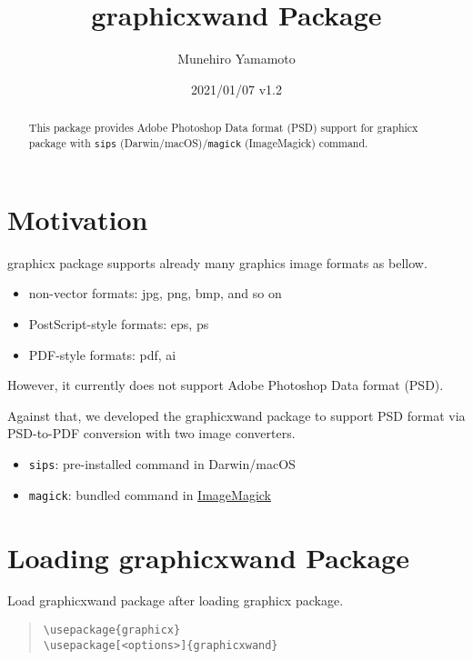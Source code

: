 \documentclass[luatex]{article}
\title{\textsf{graphicxwand} Package}
\author{Munehiro Yamamoto} %
\date{2021/01/07 v1.2} %
\begin{document}
\maketitle
\begin{abstract} %
This package provides Adobe Photoshop Data format (PSD) support
for \textsf{graphicx} package
with \texttt{sips} (Darwin/macOS)/\texttt{magick} (ImageMagick) command.
\end{abstract}


\section{Motivation} %
\textsf{graphicx} package supports already many graphics image formats as bellow.
\begin{itemize}
\item non-vector formats: jpg, png, bmp, and so on
\item PostScript-style formats: eps, ps
\item PDF-style formats: pdf, ai
\end{itemize}
However, it currently does not support Adobe Photoshop Data format (PSD).

Against that, we developed the \textsf{graphicxwand} package
to support PSD format via PSD-to-PDF conversion
with two image converters.
\begin{itemize}
\item \texttt{sips}:
pre-installed command in Darwin/macOS

\item \texttt{magick}:
bundled command in \href{https://www.imagemagick.org/}{ImageMagick}
\end{itemize}

\section{Loading \textsf{graphicxwand} Package}

Load \textsf{graphicxwand} package after loading \textsf{graphicx} package.

\begin{quote}
\begin{verbatim}
\usepackage{graphicx}
\usepackage[<options>]{graphicxwand}
\end{verbatim}
\end{quote}
\end{document}
